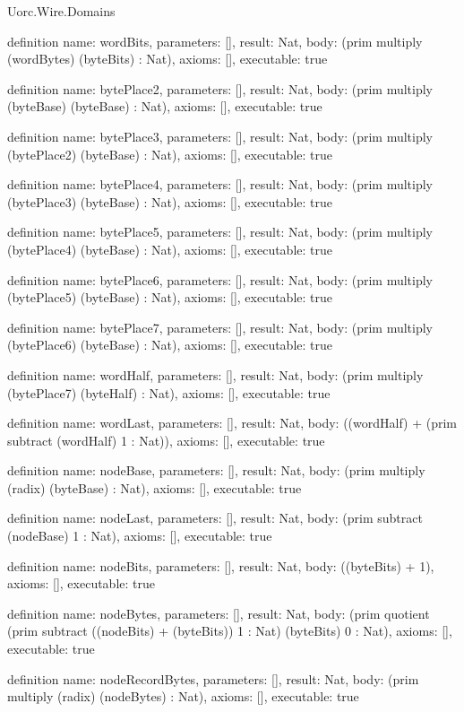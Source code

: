 \begin{lexlean}{Uorc.Wire.Domains}
\begin{semanticmodule}
definition{
  name: wordBits,
  parameters: [],
  result: Nat,
  body: (prim multiply (wordBytes) (byteBits) : Nat),
  axioms: [],
  executable: true
}

definition{
  name: bytePlace2,
  parameters: [],
  result: Nat,
  body: (prim multiply (byteBase) (byteBase) : Nat),
  axioms: [],
  executable: true
}

definition{
  name: bytePlace3,
  parameters: [],
  result: Nat,
  body: (prim multiply (bytePlace2) (byteBase) : Nat),
  axioms: [],
  executable: true
}

definition{
  name: bytePlace4,
  parameters: [],
  result: Nat,
  body: (prim multiply (bytePlace3) (byteBase) : Nat),
  axioms: [],
  executable: true
}

definition{
  name: bytePlace5,
  parameters: [],
  result: Nat,
  body: (prim multiply (bytePlace4) (byteBase) : Nat),
  axioms: [],
  executable: true
}

definition{
  name: bytePlace6,
  parameters: [],
  result: Nat,
  body: (prim multiply (bytePlace5) (byteBase) : Nat),
  axioms: [],
  executable: true
}

definition{
  name: bytePlace7,
  parameters: [],
  result: Nat,
  body: (prim multiply (bytePlace6) (byteBase) : Nat),
  axioms: [],
  executable: true
}

definition{
  name: wordHalf,
  parameters: [],
  result: Nat,
  body: (prim multiply (bytePlace7) (byteHalf) : Nat),
  axioms: [],
  executable: true
}

definition{
  name: wordLast,
  parameters: [],
  result: Nat,
  body: ((wordHalf) + (prim subtract (wordHalf) 1 : Nat)),
  axioms: [],
  executable: true
}

definition{
  name: nodeBase,
  parameters: [],
  result: Nat,
  body: (prim multiply (radix) (byteBase) : Nat),
  axioms: [],
  executable: true
}

definition{
  name: nodeLast,
  parameters: [],
  result: Nat,
  body: (prim subtract (nodeBase) 1 : Nat),
  axioms: [],
  executable: true
}

definition{
  name: nodeBits,
  parameters: [],
  result: Nat,
  body: ((byteBits) + 1),
  axioms: [],
  executable: true
}

definition{
  name: nodeBytes,
  parameters: [],
  result: Nat,
  body: (prim quotient (prim subtract ((nodeBits) + (byteBits)) 1 : Nat) (byteBits) 0 : Nat),
  axioms: [],
  executable: true
}

definition{
  name: nodeRecordBytes,
  parameters: [],
  result: Nat,
  body: (prim multiply (radix) (nodeBytes) : Nat),
  axioms: [],
  executable: true
}


\end{semanticmodule}
\end{lexlean}
